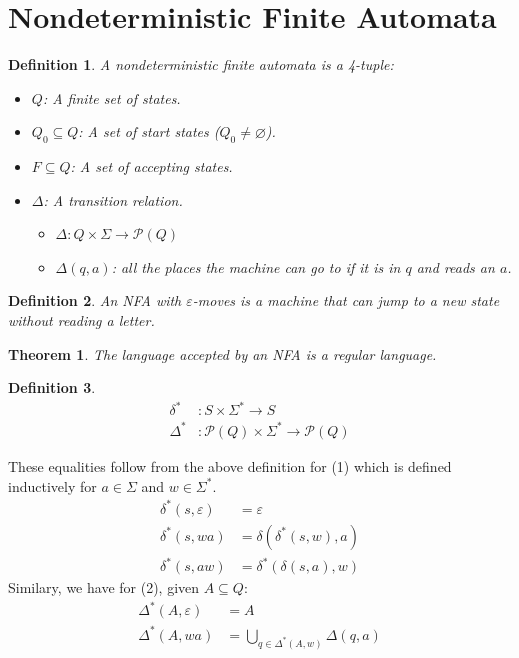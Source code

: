 \documentclass{article}
\newtheorem{theorem}{Theorem}
\newtheorem{definition}{Definition}
\begin{document}
\section{Nondeterministic Finite Automata}
\begin{definition}
A nondeterministic finite automata is a 4-tuple:
\begin{itemize}
    \item $Q$: A finite set of states.
    \item $Q_0 \subseteq Q$: A set of start states ($Q_0 \ne \varnothing$).
    \item $F \subseteq Q$: A set of accepting states.
    \item $\Delta$: A transition relation.
    \begin{itemize}
        \item $\Delta : Q \times \Sigma \rightarrow \mathcal{P}(Q)$
        \item $\Delta(q, a)$: all the places the machine can go to if it is in $q$ and reads an $a$.
    \end{itemize}
\end{itemize}
\end{definition}
\begin{definition}
An NFA with $\varepsilon$-moves is a machine that can jump to a new state without reading a letter.
\end{definition}
\begin{theorem}
The language accepted by an NFA is a regular language.
\end{theorem}
\begin{definition}
\begin{align}
    \delta^* &: S \times \Sigma^* \rightarrow S\\
    \Delta^* &: \mathcal{P}(Q) \times \Sigma^* \rightarrow \mathcal{P}(Q)
\end{align}
\end{definition}
\noindent These equalities follow from the above definition for (1) which is defined inductively for $a \in \Sigma$ and $w \in \Sigma^*$.
\begin{align*}
    \delta^*(s,\varepsilon) &= \varepsilon\\
    \delta^*(s,wa) &= \delta(\delta^*(s,w), a)\\
    \delta^*(s,aw) &= \delta^*(\delta(s,a), w)
\end{align*}
Similary, we have for (2), given $A \subseteq Q$:
\begin{align*}
    \Delta^*(A, \varepsilon) &= A\\
    \Delta^*(A, wa) &= \bigcup_{q \in \Delta^*(A,w)}\Delta(q,a)
\end{align*}
\end{document}
